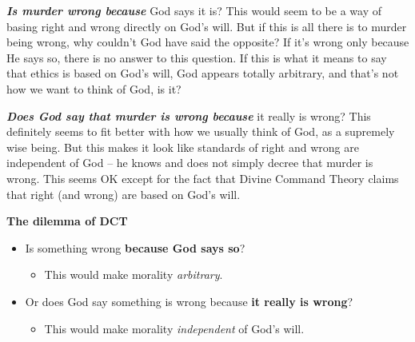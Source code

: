 \documentclass[12pt, openany]{book}
\makeatletter
\providecommand{\tightlist}{%
  \setlength{\itemsep}{0pt}\setlength{\parskip}{0pt}}
\newenvironment{kframe}{%
\medskip{}
\setlength{\fboxsep}{.8em}
 \def\at@end@of@kframe{}%
 \ifinner\ifhmode%
  \def\at@end@of@kframe{\end{minipage}}%
  \begin{minipage}{\columnwidth}%
 \fi\fi%
 \def\FrameCommand##1{\hskip\@totalleftmargin \hskip-\fboxsep
 \colorbox{shadecolor}{##1}\hskip-\fboxsep
     \hskip-\linewidth \hskip-\@totalleftmargin \hskip\columnwidth}%
 \MakeFramed {\advance\hsize-\width
   \@totalleftmargin\z@ \linewidth\hsize
   \@setminipage}}%
 {\par\unskip\endMakeFramed%
 \at@end@of@kframe}
\newenvironment{rmdblock}[1]
  {
  \begin{itemize}
  \renewcommand{\labelitemi}{
    \raisebox{-.7\height}[0pt][0pt]{
      {\setkeys{Gin}{width=3em,keepaspectratio}\texttt{[image: img/\#1]}}
    }
  }
  \setlength{\fboxsep}{1em}
  \begin{kframe}
  \item
  }
  {
  \end{kframe}
  \end{itemize}
  }
\newenvironment{rmdcaution}
  {\begin{rmdblock}{caution}}
  {\end{rmdblock}}
\makeatother
\begin{document}
\textbf{\emph{Is murder wrong because}} God says it is? This would seem to be a way of basing right and wrong directly on God's will. But if this is all there is to murder being wrong, why couldn't God have said the opposite? If it's wrong only because He says so, there is no answer to this question. If this is what it means to say that ethics is based on God's will, God appears totally arbitrary, and that's not how we want to think of God, is it?

\textbf{\emph{Does God say that murder is wrong because}} it really is wrong? This definitely seems to fit better with how we usually think of God, as a supremely wise being. But this makes it look like standards of right and wrong are independent of God -- he knows and does not simply decree that murder is wrong. This seems OK except for the fact that Divine Command Theory claims that right (and wrong) are based on God's will.

\begin{rmdcaution}

\textbf{The dilemma of DCT}

\begin{itemize}
\tightlist
\item
  Is something wrong \textbf{because God says so}?

  \begin{itemize}
  \tightlist
  \item
    This would make morality \emph{arbitrary}.
  \end{itemize}
\item
  Or does God say something is wrong because \textbf{it really is wrong}?

  \begin{itemize}
  \tightlist
  \item
    This would make morality \emph{independent} of God's will.
  \end{itemize}
\end{itemize}

\end{rmdcaution}
\end{document}
